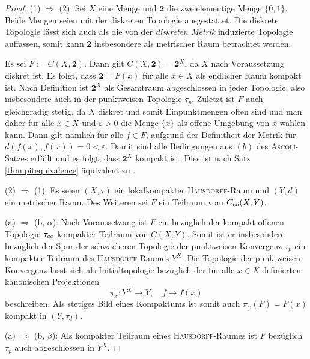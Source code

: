 \begin{proof}
  (1) $\Rightarrow$ (2): Sei $X$ eine Menge und $\mathbf{2}$ die zweielementige Menge $\{0,1\}$. Beide Mengen seien  mit der diskreten Topologie ausgestattet. 
  Die diskrete Topologie lässt sich auch als die von der \textit{diskreten Metrik} induzierte Topologie auffassen, somit kann $\mathbf{2}$ insbesondere als metrischer Raum betrachtet werden. 

  Es sei $F := C(X, \mathbf{2})$.
  Dann gilt $C(X, \mathbf{2}) = \mathbf{2}^X$, da $X$ nach Voraussetzung diskret ist.
  Es folgt, dass $\mathbf{2} = F(x)$ für alle $x \in X$ als endlicher Raum kompakt ist.
  Nach Definition ist $\mathbf{2}^X$ als Gesamtraum abgeschlossen in jeder Topologie, also insbesondere auch in der punktweisen Topologie $\tau_p$.
  Zuletzt ist $F$ auch gleichgradig stetig, da $X$ diskret und somit Einpunktmengen offen sind und man daher für alle $x \in X$ und $\varepsilon > 0$ die Menge $\{x\}$ als offene Umgebung von $x$ wählen kann.
  Dann gilt nämlich für alle $f \in F$, aufgrund der Definitheit der Metrik für  $d(f(x),f(x)) = 0 < \varepsilon$.
  Damit sind alle Bedingungen aus $(b)$ des \textsc{Ascoli}-Satzes erfüllt und es folgt, dass $\mathbf{2}^X$ kompakt ist. 
  Dies ist nach Satz \ref{thm:pitequivalence} äquivalent zu \PIT.

  (2) $\Rightarrow$ (1): Es seien $(X,\tau)$ ein lokalkompakter \textsc{Hausdorff}-Raum und $(Y,d)$ ein metrischer Raum.
  Des Weiteren sei $F$ ein Teilraum vom $C_{\mathrm{co}}(X,Y)$.

  (a) $\Rightarrow$ (b, $\alpha$): 
  Nach Voraussetzung ist $F$ ein bezüglich der kompakt-offenen Topologie $\tau_{\mathrm{co}}$ kompakter Teilraum von $C(X,Y)$.
  Somit ist er insbesondere bezüglich der Spur der schwächeren Topologie der punktweisen Konvergenz $\tau_p$ ein kompakter Teilraum des \textsc{Hausdorff}-Raumes $Y^X$.
  Die Topologie der punktweisen Konvergenz lässt sich als Initialtopologie bezüglich der für alle $x \in X$ definierten kanonischen Projektionen 
  \begin{displaymath}
    \pi_x : Y^X \to Y, \quad f \mapsto f(x)
  \end{displaymath}
  beschreiben.
  Als stetiges Bild eines Kompaktums ist somit auch $\pi_x(F) = F(x)$ kompakt in $(Y,\tau_d)$.

  (a) $\Rightarrow$ (b, $\beta$):  
  Als kompakter Teilraum eines \textsc{Hausdorff}-Raumes ist $F$ bezüglich $\tau_p$ auch abgeschlossen in $Y^X$.


\end{proof}

